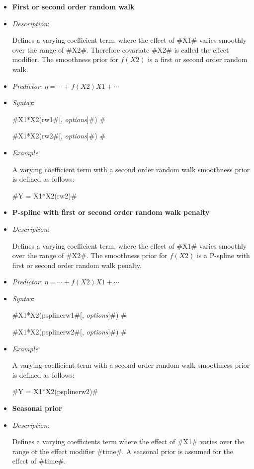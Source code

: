 \begin{itemize}
\item[]{\bf\sffamily First or second order random walk}

\item[] {\em Description}:

Defines a varying coefficient term, where the effect of #X1#
varies smoothly over the range of #X2#. Therefore covariate #X2#
is called the effect modifier. The smoothness prior for $f(X2)$ is
a first or second order random walk. \item[] {\em Predictor}:
$\eta= \cdots + f(X2)X1 + \cdots$ \item[] {\em Syntax}:

#X1*X2(rw1#[, {\em options}]#) #

#X1*X2(rw2#[, {\em options}]#) #
\item[] {\em Example}:

A varying coefficient term with a second order random walk
smoothness prior is defined as follows:

#Y = X1*X2(rw2)#

\item[] {\bf\sffamily P-spline with first or second order random
walk penalty}

\item[] {\em Description}:

Defines a varying coefficient term, where the effect of #X1#
varies smoothly over the range of #X2#. The smoothness prior for
$f(X2)$ is a P-spline with first or second order random walk
penalty. \item[] {\em Predictor}: $\eta= \cdots + f(X2)X1 +
\cdots$ \item[] {\em Syntax}:

#X1*X2(psplinerw1#[, {\em options}]#) #

#X1*X2(psplinerw2#[, {\em options}]#) #
\item[] {\em Example}:

A varying coefficient term with a second order random walk
smoothness prior is defined as follows:

#Y = X1*X2(psplinerw2)#

\item[]{\bf\sffamily Seasonal prior}

\item[] {\em Description}:

Defines a varying coefficients term where the effect of #X1#
varies over the range of the effect modifier #time#. A seasonal
prior is assumed for the effect of #time#.


\end{itemize}
